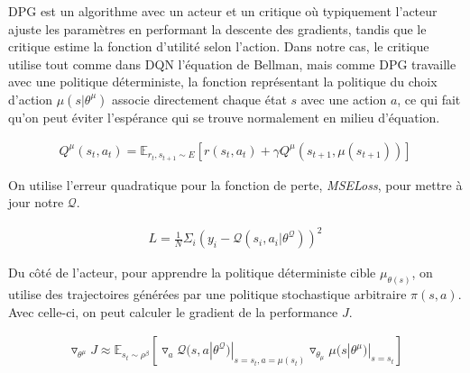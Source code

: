 \documentclass[letterpaper, french]{article}
\begin{document}
DPG est un algorithme avec un acteur et un critique où typiquement l'acteur ajuste les paramètres en performant la descente des gradients, tandis que le critique estime la fonction d'utilité selon l'action. Dans notre cas, le critique utilise tout comme dans DQN l'équation de Bellman, mais comme DPG travaille avec une politique déterministe, la fonction représentant la politique du choix d'action $\mu (s|\theta^\mu)$ associe directement chaque état $s$ avec une action $a$, ce qui fait qu'on peut éviter l'espérance qui se trouve normalement en milieu d'équation.
\begingroup
\begin{center}
\begin{equation}\label{eq:critiqueAvecDeterministe}
\begin{split}
 Q^{\mu}(s_t, a_t) = \mathbb{E}_{r_t, s_{t+1}\sim E} \left[r(s_t, a_t)+ \gamma Q^{\mu}(s_{t+1}, \mu(s_{t+1}))\right]
\end{split}
\end{equation}
\end{center}
\endgroup
On utilise l'erreur quadratique pour la fonction de perte, \textit{MSELoss}, pour mettre à jour notre $\mathcal{Q}$.
\begingroup
\begin{center}
\begin{equation}\label{eq:perte}
\begin{split}
L = \frac{1}{N} \Sigma_i (y_i - \mathcal{Q}(s_i, a_i|\theta^{\mathcal{Q}}))^2
\end{split}
\end{equation}
\end{center}
\endgroup
Du côté de l'acteur, pour apprendre la politique déterministe cible ${\mu}_{\theta (s)}$, on utilise des trajectoires générées par une politique stochastique arbitraire $\pi (s, a)$. Avec celle-ci, on peut calculer le gradient de la performance $J$.
\begingroup
\begin{center}
\begin{equation}\label{eq:acteur}
\begin{split}
 \triangledown_{\theta^{\mu}}J \approx \mathbb{E}_{s_t \sim \rho^\beta} \left[\triangledown_{a}\mathcal{Q}(s, a|\theta^{\mathcal{Q}})|_{s=s_t, a=\mu(s_t)}\triangledown_{\theta_{\mu}}\mu(s|\theta^{\mu})|_{s=s_t}\right]
\end{split}
\end{equation}
\end{center}
\endgroup
\end{document}
